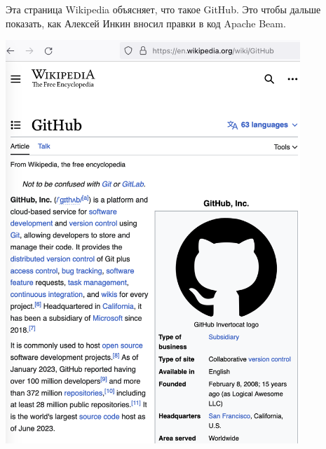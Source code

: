 
Эта страница Wikipedia объясняет, что такое GitHub.
Это чтобы дальше показать, как Алексей Инкин вносил правки в код Apache Beam.

\begin{center}
    \includegraphics[width=30em]{github-wikipedia}
\end{center}

\pagebreak
